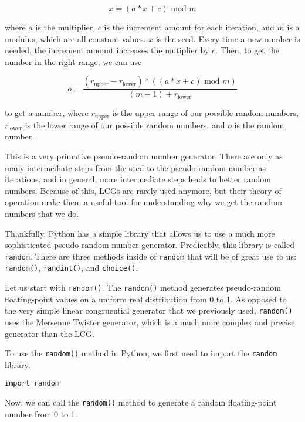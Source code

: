 $$
x = (a * x + c) \text{ mod }m
$$

where $a$ is the multiplier, $c$ is the increment amount for each iteration, and $m$ is a modulus, which are all constant values. $x$ is the seed. Every time a new number is needed, the increment amount increases the mutiplier by $c$. Then, to get the number in the right range, we can use

$$
o = \frac{(r_\text{upper} - r_\text{lower}) * ((a * x + c) \text{ mod }m)}{(m - 1) + r_\text{lower}}
$$

to get a number, where $r_\text{upper}$ is the upper range of our possible random numbers, $r_\text{lower}$ is the lower range of our possible random numbers, and $o$ is the random number.\par
This is a very primative pseudo-random number generator. There are only as many intermediate steps from the seed to the pseudo-random number as iterations, and in general, more intermediate steps leads to better random numbers. Because of this, LCGs are rarely used anymore, but their theory of operation make them a useful tool for understanding why we get the random numbers that we do.\par
Thankfully, Python has a simple library that allows us to use a much more sophisticated pseudo-random number generator. Predicably, this library is called \verb|random|. There are three methods inside of \verb|random| that will be of great use to us: \verb|random()|, \verb|randint()|, and \verb|choice()|.\par
Let us start with \verb|random()|. The \verb|random()| method generates pseudo-random floating-point values on a uniform real distribution from 0 to 1. As opposed to the very simple linear congruential generator that we previously used, \verb|random()| uses the Mersenne Twister generator, which is a much more complex and precise generator than the LCG.\par
{}
To use the \verb|random()| method in Python, we first need to import the \verb|random| library.\par
\begin{lstlisting}[style=pippython]
import random
\end{lstlisting}
Now, we can call the \verb|random()| method to generate a random floating-point number from 0 to 1.\par
